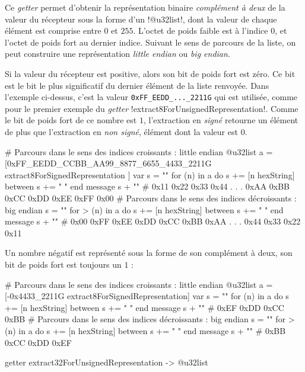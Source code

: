 Ce \emph{getter} permet d'obtenir la représentation binaire \emph{complément à deux} de la valeur du récepteur sous la forme d'un \ggsq!@u32list!, dont la valeur de chaque élément est comprise entre $0$ et $255$. L'octet de poids faible est à l'indice $0$, et l'octet de poids fort au dernier indice. Suivant le sens de parcours de la liste, on peut construire une représentation \emph{little endian} ou \emph{big endian}.

Si la valeur du récepteur est positive, alors son bit de poids fort est zéro. Ce bit est le bit le plus significatif du dernier élément de la liste renvoyée. Dans l'exemple ci-dessus, c'est la valeur \texttt{0xFF\_EEDD\_...\_2211G} qui est utilisée, comme pour le premier exemple du \emph{getter} \ggsq!extract8ForUnsignedRepresentation!. Comme le bit de poids fort de ce nombre est $1$, l'extraction en \emph{signé} retourne un élément de plus que l'extraction en \emph{non signé}, élément dont la valeur est $0$.

\begin{galgas4}
# Parcours dans le sens des indices croissants : little endian
@u32list a = [0xFF_EEDD_CCBB_AA99_8877_6655_4433_2211G
  extract8ForSignedRepresentation
]
var s = ""
for (n) in a
  do s += [n hexString]
  between s += " "
end
message s + "\n" # 0x11 0x22 0x33 0x44 . . . 0xAA 0xBB 0xCC 0xDD 0xEE 0xFF 0x00
# Parcours dans le sens des indices décroissants : big endian
s = ""
for > (n) in a
  do s += [n hexString]
  between s += " "
end
message s + "\n" # 0x00 0xFF 0xEE 0xDD 0xCC 0xBB 0xAA . . . 0x44 0x33 0x22 0x11
\end{galgas4}

Un nombre négatif est représenté sous la forme de son complément à deux, son bit de poids fort est toujours un $1$ :

\begin{galgas4}
# Parcours dans le sens des indices croissants : little endian
@u32list a = [-0x4433_2211G extract8ForSignedRepresentation]
var s = ""
for (n) in a
  do s += [n hexString]
  between s += " "
end
message s + "\n" # 0xEF 0xDD 0xCC 0xBB
# Parcours dans le sens des indices décroissants : big endian
s = ""
for > (n) in a
  do s += [n hexString]
  between s += " "
end
message s + "\n" # 0xBB 0xCC 0xDD 0xEF
\end{galgas4}


\begin{galgas4box}
getter extract32ForUnsignedRepresentation -> @u32list
\end{galgas4box}

